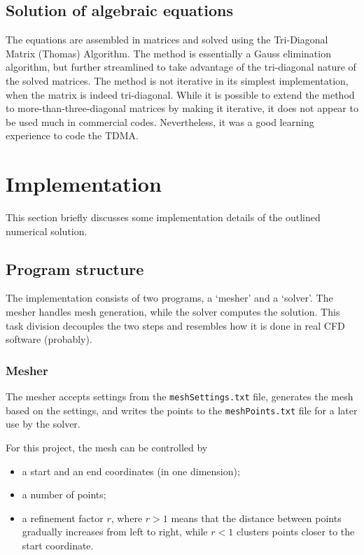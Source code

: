 \documentclass[12pt]{article}
\begin{document}
\subsection{Solution of algebraic equations}
\label{sec:solution}

The equations are assembled in matrices and solved using the Tri-Diagonal Matrix (Thomas) Algorithm. The method is essentially a Gauss elimination algorithm, but further streamlined to take advantage of the tri-diagonal nature of the solved matrices. The method is not iterative in its simplest implementation, when the matrix is indeed tri-diagonal. While it is possible to extend the method to more-than-three-diagonal matrices by making it iterative, it does not appear to be used much in commercial codes. Nevertheless, it was a good learning experience to code the TDMA.


\section{Implementation}
\label{sec:implementaion}

This section briefly discusses some implementation details of the outlined numerical solution.


\subsection{Program structure}
\label{sec:progStructure}

The implementation consists of two programs, a `mesher' and a `solver'. The mesher handles mesh generation, while the solver computes the solution. This task division decouples the two steps and resembles how it is done in real CFD software (probably).


\subsubsection{Mesher}
\label{sec:mesher}

The mesher accepts settings from the \verb|meshSettings.txt| file, generates the mesh based on the settings, and writes the points to the \verb|meshPoints.txt| file for a later use by the solver. 

For this project, the mesh can be controlled by 

\begin{itemize}
\item a start and an end coordinates (in one dimension);
\item a number of points;
\item a refinement factor $r$, where $r > 1$ means that the distance between points gradually increases from left to right, while $r < 1$ clusters points closer to the start coordinate. 
\end{itemize}
\end{document}

